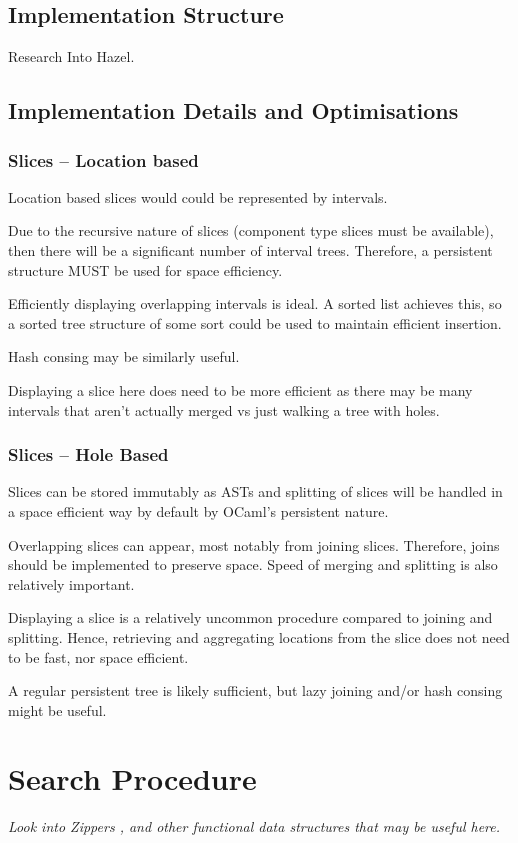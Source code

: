 \subsection{Implementation Structure}
Research Into Hazel.

\subsection{Implementation Details and Optimisations}
\subsubsection{Slices -- Location based}
Location based slices would could be represented by intervals.\par 
Due to the recursive nature of slices (component type slices must be available), then there will be a significant number of interval trees. Therefore, a persistent structure \cite[chapter~2]{PurelyFunctionalDataStructures} MUST be used for space efficiency.\par 
Efficiently displaying overlapping intervals is ideal. A sorted list achieves this, so a sorted  tree structure of some sort could be used to maintain efficient insertion.\par 
Hash consing may be similarly useful.\par 
Displaying a slice here does need to be more efficient as there may be many intervals that aren't actually merged vs just walking a tree with holes.


\subsubsection{Slices -- Hole Based}
Slices can be stored immutably as ASTs and splitting of slices will be handled in a space efficient way by default by OCaml's persistent nature.\par 
Overlapping slices can appear, most notably from joining slices. Therefore, joins should be implemented to preserve space. Speed of merging and splitting is also relatively important.\par 
Displaying a slice is a relatively uncommon procedure compared to joining and splitting. Hence, retrieving and aggregating locations from the slice does not need to be fast, nor space efficient. \par 
A regular persistent tree is likely sufficient, but lazy joining and/or hash consing \cite{HashCons} might be useful.


\section{Search Procedure}
\textit{Look into Zippers \cite{Zipper}, and other functional data structures that may be useful here.
}
